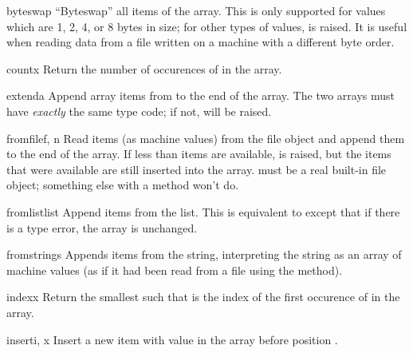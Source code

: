 \begin{methoddesc}[array]{byteswap}{}
``Byteswap'' all items of the array.  This is only supported for
values which are 1, 2, 4, or 8 bytes in size; for other types of
values,  is raised.  It is useful when reading
data from a file written on a machine with a different byte order.
\end{methoddesc}

\begin{methoddesc}[array]{count}{x}
Return the number of occurences of  in the array.
\end{methoddesc}

\begin{methoddesc}[array]{extend}{a}
Append array items from  to the end of the array.  The two
arrays must have \emph{exactly} the same type code; if not,
 will be raised.
\end{methoddesc}

\begin{methoddesc}[array]{fromfile}{f, n}
Read  items (as machine values) from the file object 
and append them to the end of the array.  If less than  items
are available,  is raised, but the items that were
available are still inserted into the array.   must be a real
built-in file object; something else with a  method won't
do.
\end{methoddesc}

\begin{methoddesc}[array]{fromlist}{list}
Append items from the list.  This is equivalent to
except that if there is a type error, the array is unchanged.
\end{methoddesc}

\begin{methoddesc}[array]{fromstring}{s}
Appends items from the string, interpreting the string as an
array of machine values (as if it had been read from a
file using the  method).
\end{methoddesc}

\begin{methoddesc}[array]{index}{x}
Return the smallest  such that  is the index of
the first occurence of  in the array.
\end{methoddesc}

\begin{methoddesc}[array]{insert}{i, x}
Insert a new item with value  in the array before position
.
\end{methoddesc}

